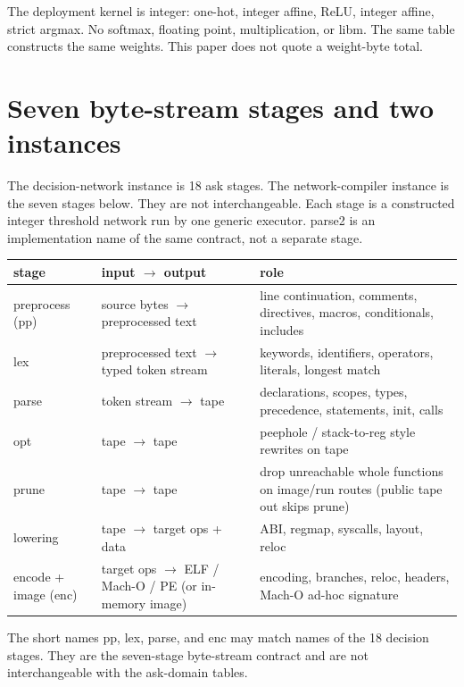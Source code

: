 \documentclass[11pt]{article}
\begin{document}
The deployment kernel is integer: one-hot, integer affine, ReLU, integer affine, strict argmax. No softmax, floating point, multiplication, or libm. The same table constructs the same weights. This paper does not quote a weight-byte total.

\section{Seven byte-stream stages and two instances}\label{from-decisions-to-a-pipeline-the-network-compiler}

The decision-network instance is 18 ask stages. The network-compiler instance is the seven stages below. They are not interchangeable. Each stage is a constructed integer threshold network run by one generic executor. parse2 is an implementation name of the same contract, not a separate stage.

\begin{center}
\footnotesize
\begin{tabular}{p{}p{}p{}}
\toprule
stage & input $\to$ output & role \\
\midrule
preprocess (pp) & source bytes $\to$ preprocessed text & line continuation, comments, directives, macros, conditionals, includes \\
lex & preprocessed text $\to$ typed token stream & keywords, identifiers, operators, literals, longest match \\
parse & token stream $\to$ tape & declarations, scopes, types, precedence, statements, init, calls \\
opt & tape $\to$ tape & peephole / stack-to-reg style rewrites on tape \\
prune & tape $\to$ tape & drop unreachable whole functions on image/run routes (public tape out skips prune) \\
lowering & tape $\to$ target ops + data & ABI, regmap, syscalls, layout, reloc \\
encode + image (enc) & target ops $\to$ ELF / Mach-O / PE (or in-memory image) & encoding, branches, reloc, headers, Mach-O ad-hoc signature \\
\bottomrule
\end{tabular}
\end{center}

The short names pp, lex, parse, and enc may match names of the 18 decision stages. They are the seven-stage byte-stream contract and are not interchangeable with the ask-domain tables.
\end{document}
